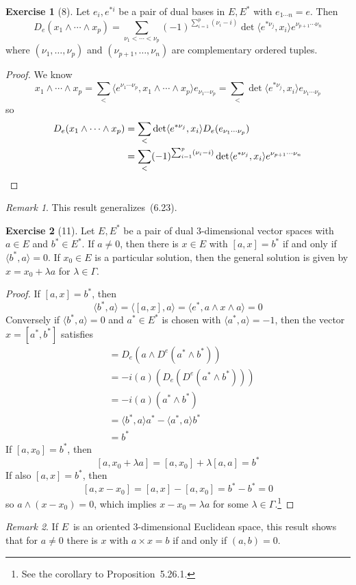 \documentclass[letterpaper,12pt]{article}
\newcommand{\cross}{\times}
\newcommand{\eprod}{\wedge}
\newcommand{\sprod}[2]{\langle#1,#2\rangle}
\newcommand{\iprod}[2]{(#1,#2)}
\newcommand{\multi}[4]{#2_{#3}#1\cdots#1#2_{#4}}
\newcommand{\eprods}[3]{\multi{\eprod}{#1}{#2}{#3}}
\theoremstyle{definition}
\newtheorem*{exer}{Exercise}
\theoremstyle{remark}
\newtheorem*{rmk}{Remark}
\begin{document}
\begin{exer}[8]
Let \(e_i,e^{*i}\) be a pair of dual bases in \(E,E^*\) with \(e_{1\cdots n}=e\). Then
\[D_e(\eprods{x}{1}{p})=\sum_{\nu_1<\cdots<\nu_p}(-1)^{\sum_{i=1}^p(\nu_i-i)}\det\sprod{e^{*\nu_j}}{x_i}e^{\nu_{p+1}\cdots\nu_n}\]
where \((\nu_1,\ldots,\nu_p)\) and \((\nu_{p+1},\ldots,\nu_n)\) are complementary ordered tuples.
\end{exer}
\begin{proof}
We know
\[\eprods{x}{1}{p}=\sum_{<}\sprod{e^{\nu_1\cdots\nu_p}}{\eprods{x}{1}{p}}e_{\nu_1\cdots\nu_p}=\sum_{<}\det\sprod{e^{*\nu_j}}{x_i}e_{\nu_1\cdots\nu_p}\]
so
\begin{align*}
D_e(\eprods{x}{1}{p})&=\sum_{<}\det\sprod{e^{*\nu_j}}{x_i}D_e(e_{\nu_1\cdots\nu_p})\\
	&=\sum_{<}(-1)^{\sum_{i=1}^p(\nu_i-i)}\det\sprod{e^{*\nu_j}}{x_i}e^{\nu_{p+1}\cdots\nu_n}\qedhere
\end{align*}
\end{proof}
\begin{rmk}
This result generalizes~(6.23).
\end{rmk}

\begin{exer}[11]
Let \(E,E^*\) be a pair of dual \(3\)-dimensional vector spaces with \(a\in E\) and \(b^*\in E^*\). If \(a\ne 0\), then there is \(x\in E\) with \([a,x]=b^*\) if and only if \(\sprod{b^*}{a}=0\). If \(x_0\in E\) is a particular solution, then the general solution is given by \(x=x_0+\lambda a\) for \(\lambda\in\Gamma\).
\end{exer}
\begin{proof}
If \([a,x]=b^*\), then
\[\sprod{b^*}{a}=\sprod{[a,x]}{a}=\sprod{e^*}{a\eprod x\eprod a}=0\]
Conversely if \(\sprod{b^*}{a}=0\) and \(a^*\in E^*\) is chosen with \(\sprod{a^*}{a}=-1\), then the vector \(x=[a^*,b^*]\) satisfies
\begin{align*}
[a,x]&=D_e(a\eprod D^e(a^*\eprod b^*))\\
	&=-i(a)(D_e(D^e(a^*\eprod b^*)))\\
	&=-i(a)(a^*\eprod b^*)\\
	&=\sprod{b^*}{a}a^*-\sprod{a^*}{a}b^*\\
	&=b^*
\end{align*}
If \([a,x_0]=b^*\), then
\[[a,x_0+\lambda a]=[a,x_0]+\lambda[a,a]=b^*\]
If also \([a,x]=b^*\), then
\[[a,x-x_0]=[a,x]-[a,x_0]=b^*-b^*=0\]
so \(a\eprod(x-x_0)=0\), which implies \(x-x_0=\lambda a\) for some \(\lambda\in\Gamma\).\footnote{See the corollary to Proposition~5.26.1.}
\end{proof}
\begin{rmk}
If \(E\)~is an oriented \(3\)-dimensional Euclidean space, this result shows that for \(a\ne 0\) there is \(x\) with \(a\cross x=b\) if and only if \(\iprod{a}{b}=0\).
\end{rmk}
\end{document}
